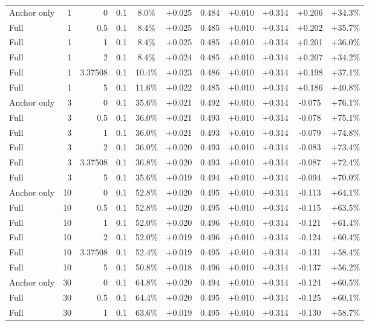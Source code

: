 \begin{table}[htbp]
\begin{tabular}{lrrrccccccc}
Anchor only & 1 & 0 & 0.1 & 8.0\% & +0.025 & 0.484 & +0.010 & +0.314 & +0.206 & +34.3\% \\
Full & 1 & 0.5 & 0.1 & 8.4\% & +0.025 & 0.485 & +0.010 & +0.314 & +0.202 & +35.7\% \\
Full & 1 & 1 & 0.1 & 8.4\% & +0.025 & 0.485 & +0.010 & +0.314 & +0.201 & +36.0\% \\
Full & 1 & 2 & 0.1 & 8.4\% & +0.024 & 0.485 & +0.010 & +0.314 & +0.207 & +34.2\% \\
Full & 1 & 3.37508 & 0.1 & 10.4\% & +0.023 & 0.486 & +0.010 & +0.314 & +0.198 & +37.1\% \\
Full & 1 & 5 & 0.1 & 11.6\% & +0.022 & 0.485 & +0.010 & +0.314 & +0.186 & +40.8\% \\
Anchor only & 3 & 0 & 0.1 & 35.6\% & +0.021 & 0.492 & +0.010 & +0.314 & -0.075 & +76.1\% \\
Full & 3 & 0.5 & 0.1 & 36.0\% & +0.021 & 0.493 & +0.010 & +0.314 & -0.078 & +75.1\% \\
Full & 3 & 1 & 0.1 & 36.0\% & +0.021 & 0.493 & +0.010 & +0.314 & -0.079 & +74.8\% \\
Full & 3 & 2 & 0.1 & 36.0\% & +0.020 & 0.493 & +0.010 & +0.314 & -0.083 & +73.4\% \\
Full & 3 & 3.37508 & 0.1 & 36.8\% & +0.020 & 0.493 & +0.010 & +0.314 & -0.087 & +72.4\% \\
Full & 3 & 5 & 0.1 & 35.6\% & +0.019 & 0.494 & +0.010 & +0.314 & -0.094 & +70.0\% \\
Anchor only & 10 & 0 & 0.1 & 52.8\% & +0.020 & 0.495 & +0.010 & +0.314 & -0.113 & +64.1\% \\
Full & 10 & 0.5 & 0.1 & 52.8\% & +0.020 & 0.495 & +0.010 & +0.314 & -0.115 & +63.5\% \\
Full & 10 & 1 & 0.1 & 52.0\% & +0.020 & 0.496 & +0.010 & +0.314 & -0.121 & +61.4\% \\
Full & 10 & 2 & 0.1 & 52.0\% & +0.019 & 0.496 & +0.010 & +0.314 & -0.124 & +60.4\% \\
Full & 10 & 3.37508 & 0.1 & 52.4\% & +0.019 & 0.495 & +0.010 & +0.314 & -0.131 & +58.4\% \\
Full & 10 & 5 & 0.1 & 50.8\% & +0.018 & 0.496 & +0.010 & +0.314 & -0.137 & +56.2\% \\
Anchor only & 30 & 0 & 0.1 & 64.8\% & +0.020 & 0.494 & +0.010 & +0.314 & -0.124 & +60.5\% \\
Full & 30 & 0.5 & 0.1 & 64.4\% & +0.020 & 0.495 & +0.010 & +0.314 & -0.125 & +60.1\% \\
Full & 30 & 1 & 0.1 & 63.6\% & +0.019 & 0.495 & +0.010 & +0.314 & -0.130 & +58.7\% \\

\end{tabular}
\end{table}
